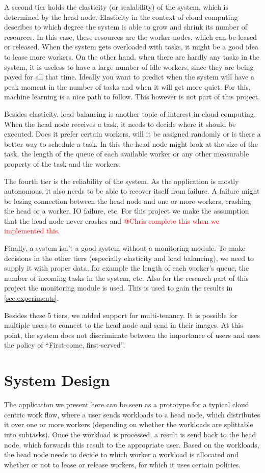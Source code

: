 \documentclass{stylesheet}
\begin{document}
A second tier holds the elasticity (or scalability) of the system, which is determined by the head node. Elasticity in the context of cloud computing describes to which degree the system is able to grow and shrink its number of resources. In this case, these resources are the worker nodes, which can be leased or released. When the system gets overloaded with tasks, it might be a good idea to lease more workers. On the other hand, when there are hardly any tasks in the system, it is useless to have a large number of idle workers, since they are being payed for all that time. Ideally you want to predict when the system will have a peak moment in the number of tasks and when it will get more quiet. For this, machine learning is a nice path to follow. This however is not part of this project.

Besides elasticity, load balancing is another topic of interest in cloud computing. When the head node receives a task, it needs to decide where it should be executed. Does it prefer certain workers, will it be assigned randomly or is there a better way to schedule a task. In this the head node might look at the size of the task, the length of the queue of each available worker or any other measurable property of the task and the workers.

The fourth tier is the reliability of the system. As the application is mostly autonomous, it also needs to be able to recover itself from failure. A failure might be losing connection between the head node and one or more workers, crashing the head or a worker, IO failure, etc. For this project we make the assumption that the head node never crashes and \textcolor{red}{@Chris complete this when we implemented this}.

Finally, a system isn't a good system without a monitoring module. To make decisions in the other tiers (especially elasticity and load balancing), we need to supply it with proper data, for example the length of each worker's queue, the number of incoming tasks in the system, etc. Also for the research part of this project the monitoring module is used. This is used to gain the results in \cref{sec:experiments}.

Besides these 5 tiers, we added support for multi-tenancy. It is possible for multiple users to connect to the head node and send in their images. At this point, the system does not discriminate between the importance of users and uses the policy of ``First-come, first-served''.

\section{System Design}
\label{sec:design}
The application we present here can be seen as a prototype for a typical cloud centric work flow, where a user sends workloads to a head node, which distributes it over one or more workers (depending on whether the workloads are splittable into subtasks). Once the workload is processed, a result is send back to the head node, which forwards this result to the appropriate user. Based on the workloads, the head node needs to decide to which worker a workload is allocated and whether or not to lease or release workers, for which it uses certain policies.
\end{document}
